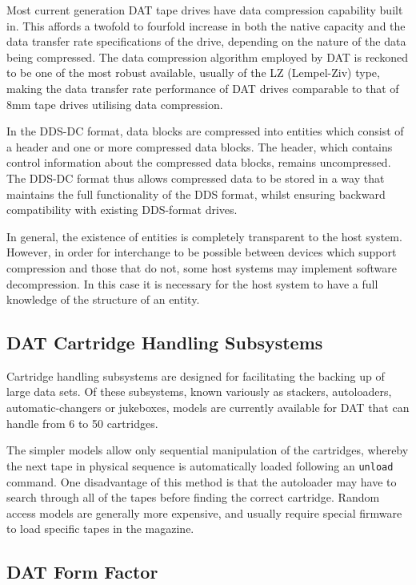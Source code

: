 \documentclass[11pt]{article}
\begin{document}
Most current generation DAT tape drives have data compression capability
built in. This affords a twofold to fourfold increase in both the native
capacity and the data transfer rate specifications of the drive, depending
on the nature of the data being compressed. The data compression algorithm
employed by DAT is reckoned to be one of the most robust available, usually
of the LZ (Lempel-Ziv) type, making the data transfer rate performance of
DAT drives comparable to that of 8mm tape drives utilising data compression.

In the DDS-DC format, data blocks are compressed into entities which consist
of a header and one or more compressed data blocks. The header, which
contains control information about the compressed data blocks, remains
uncompressed. The DDS-DC format thus allows compressed data to be stored in
a way that maintains the full functionality of the DDS format, whilst
ensuring backward compatibility with existing DDS-format drives.

In general, the existence of entities is completely transparent to the host
system. However, in order for interchange to be possible between devices
which support compression and those that do not, some host systems may
implement software decompression. In this case it is necessary for the host
system to have a full knowledge of the structure of an entity.

\subsection {DAT Cartridge Handling Subsystems}

Cartridge handling subsystems are designed for facilitating the backing up
of large data sets. Of these subsystems, known variously as stackers,
autoloaders, automatic-changers or jukeboxes, models are currently available
for DAT that can handle from 6 to 50 cartridges.

The simpler models allow only sequential manipulation of the cartridges,
whereby the next tape in physical sequence is automatically loaded following
an {\tt unload} command. One disadvantage of this method is that the autoloader
may have to search through all of the tapes before finding the correct
cartridge. Random access models are generally more expensive, and usually
require special firmware to load specific tapes in the magazine.

\subsection {DAT Form Factor}
\end{document}
